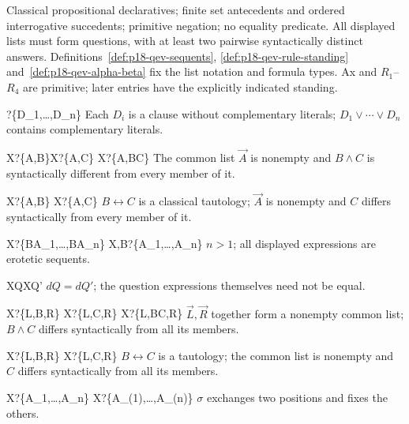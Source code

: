   {Classical propositional declaratives; finite set antecedents and ordered
  interrogative succedents; primitive negation; no equality predicate.
  All displayed lists must form questions, with at least two pairwise
  syntactically distinct answers. Definitions~\ref{def:p18-qev-sequents},
  \ref{def:p18-qev-rule-standing} and~\ref{def:p18-qev-alpha-beta}
  fix the list notation and formula types. Ax and \(R_1\)--\(R_4\)
  are primitive; later entries have the explicitly indicated standing.}

  {}
  {\vdash ?\{D_1,\ldots,D_n\}}
  {Each \(D_i\) is a clause without complementary literals;
   \(D_1\lor\cdots\lor D_n\) contains complementary literals.}

  {X\vdash ?\{\vec A,B\}\qquad X\vdash ?\{\vec A,C\}}
  {X\vdash ?\{\vec A,B\land C\}}
  {The common list \(\vec A\) is nonempty and \(B\land C\)
   is syntactically different from every member of it.}

  {X\vdash ?\{\vec A,B\}}
  {X\vdash ?\{\vec A,C\}}
  {\(B\leftrightarrow C\) is a classical tautology;
   \(\vec A\) is nonempty and \(C\) differs syntactically
   from every member of it.}

  {X\vdash ?\{B\to A_1,\ldots,B\to A_n\}}
  {X,B\vdash ?\{A_1,\ldots,A_n\}}
  {\(n>1\); all displayed expressions are erotetic sequents.}

  {X\vdash Q}{X\vdash Q'}
  {\(dQ=dQ'\); the question expressions themselves need not be equal.}

  {X\vdash ?\{\vec L,B,\vec R\}\qquad
   X\vdash ?\{\vec L,C,\vec R\}}
  {X\vdash ?\{\vec L,B\land C,\vec R\}}
  {\(\vec L,\vec R\) together form a nonempty common list;
   \(B\land C\) differs syntactically from all its members.}

  {X\vdash ?\{\vec L,B,\vec R\}}
  {X\vdash ?\{\vec L,C,\vec R\}}
  {\(B\leftrightarrow C\) is a tautology; the common list is
   nonempty and \(C\) differs syntactically from all its members.}

  {X\vdash ?\{A_1,\ldots,A_n\}}
  {X\vdash ?\{A_{\sigma(1)},\ldots,A_{\sigma(n)}\}}
  {\(\sigma\) exchanges two positions and fixes the others.}

